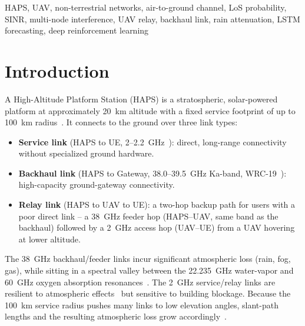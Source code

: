 \documentclass[]{ieeeaccess}
\begin{document}
\begin{IEEEkeywords}
HAPS, UAV, non-terrestrial networks, air-to-ground channel, LoS probability, SINR, multi-node interference, UAV relay, backhaul link, rain attenuation, LSTM forecasting, deep reinforcement learning
\end{IEEEkeywords}

\titlepgskip=-15pt

\maketitle

\section{Introduction}

A High-Altitude Platform Station (HAPS) is a stratospheric, solar-powered platform at approximately 20~km altitude with a fixed service footprint of up to 100~km radius~\cite{itu_m2101,itu_m2106}. It connects to the ground over three link types:

\begin{itemize}\setlength{\itemsep}{1pt}
  \item \textbf{Service link} (HAPS to UE, 2--2.2~GHz~\cite{3gpp_ts38101_5}): direct, long-range connectivity without specialized ground hardware.
  \item \textbf{Backhaul link} (HAPS to Gateway, 38.0--39.5~GHz Ka-band, WRC-19~\cite{wrc19}): high-capacity ground-gateway connectivity.
  \item \textbf{Relay link} (HAPS to UAV to UE): a two-hop backup path for users with a poor direct link -- a 38~GHz feeder hop (HAPS--UAV, same band as the backhaul) followed by a 2~GHz access hop (UAV--UE) from a UAV hovering at lower altitude.
\end{itemize}

The 38~GHz backhaul/feeder links incur significant atmospheric loss (rain, fog, gas), while sitting in a spectral valley between the 22.235~GHz water-vapor and 60~GHz oxygen absorption resonances~\cite{itu_p676}. The 2~GHz service/relay links are resilient to atmospheric effects~\cite{itu_p618} but sensitive to building blockage. Because the 100~km service radius pushes many links to low elevation angles, slant-path lengths and the resulting atmospheric loss grow accordingly~\cite{itu_p618}.
\end{document}
